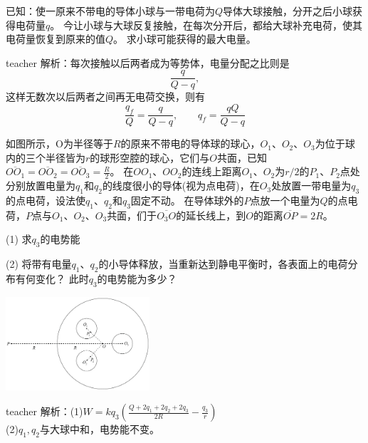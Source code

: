 \begin{example}
已知：使一原来不带电的导体小球与一带电荷为$Q$导体大球接触，分开之后小球获得电荷量$q$。
今让小球与大球反复接触，在每次分开后，都给大球补充电荷，使其电荷量恢复到原来的值$Q$。
求小球可能获得的最大电量。

\begin{taggedblock}{teacher}
\noindent
解析：每次接触以后两者成为等势体，电量分配之比则是
\[
\frac{q}{Q-q},
\]
这样无数次以后两者之间再无电荷交换，则有
\[
\frac{q_f}{Q} = \frac{q}{Q-q},\qquad q_f = \frac{qQ}{Q-q}
\]
\end{taggedblock}
\end{example}








\begin{example}
如图所示，O为半径等于$R$的原来不带电的导体球的球心，$O_1$、$O_2$、$O_3$为位于球内的三个半径皆为$r$的球形空腔的球心，它们与$O$共面，已知$\overline{OO_1}=\overline{OO_2}=\overline{OO_3}=\frac{R}{2}$。
在$OO_1、OO_2$的连线上距离$O_1、O_2$为$r/2$的$P_1、P_2$点处分别放置电量为$q_1$和$q_2$的线度很小的导体(视为点电荷)，在$O_3$处放置一带电量为$q_3$的点电荷，设法使$q_1、q_2$和$q_3$固定不动。
在导体球外的$P$点放一个电量为$Q$的点电荷，$P$点与$O_1、O_2、O_3$共面，们于$\overline{O_3O}$的延长线上，到$O$的距离$\overline{OP}=2R$。

(1) 求$q_3$的电势能

(2) 将带有电量$q_1、q_2$的小导体释放，当重新达到静电平衡时，各表面上的电荷分布有何变化？
此时$q_3$的电势能为多少？
\begin{flushright}
\includegraphics[width = 0.4\textwidth]{images/elec-problem-12.pdf} 
\end{flushright}
\begin{taggedblock}{teacher}
\noindent
解析：(1)$W=kq_3(\frac{Q+2q_1+2q_2+2q_3}{2R}-\frac{q_3}{r})$
\\(2)$q_1,q_2$与大球中和，电势能不变。
\end{taggedblock}
\end{example}

